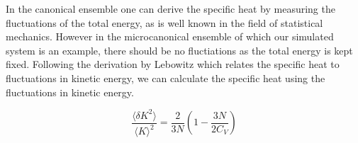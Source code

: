 \documentclass[
10pt, %
a4paper, %
oneside, %
headinclude,footinclude, %
BCOR5mm, %
]{scrartcl}
\begin{document}






In the canonical ensemble one can derive the specific heat by measuring the fluctuations of the total energy, as is well known in the field of statistical mechanics. 
However in the microcanonical ensemble of which our simulated system is an example, there should be no fluctiations as the total energy is kept fixed.
Following the derivation by Lebowitz\cite{Duane:1985lz} which relates the specific heat to fluctuations in kinetic energy, we can calculate the specific heat using the fluctuations in kinetic energy.



\begin{equation} 
\frac{\langle\delta K^2\rangle}{\langle K\rangle^2} = \frac{2}{3N} \left ( 1 - \frac{3N}{2C_V} \right ) 
\end{equation}
\end{document}
